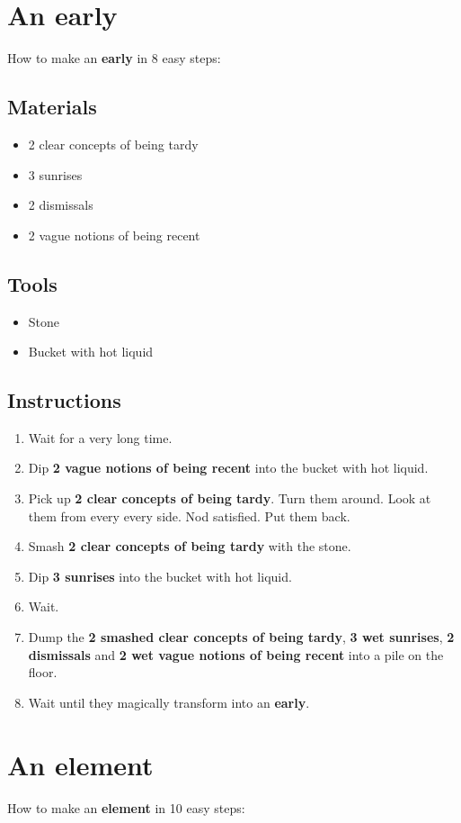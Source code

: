 \documentclass{article}
\begin{document}
\section{An early}How to make an \textbf{early} in 8 easy steps:

\subsection{Materials}\begin{itemize}
\item 
2 clear concepts of being tardy
\item 
3 sunrises
\item 
2 dismissals
\item 
2 vague notions of being recent
\end{itemize}
\subsection{Tools}\begin{itemize}
\item 
Stone
\item 
Bucket with hot liquid
\end{itemize}
\subsection{Instructions}\begin{enumerate}
\item 
Wait for a very long time.
\item 
Dip \textbf{2 vague notions of being recent} into the bucket with hot liquid.
\item 
Pick up \textbf{2 clear concepts of being tardy}. Turn them around. Look at them from every every side. Nod satisfied. Put them back.
\item 
Smash \textbf{2 clear concepts of being tardy} with the stone.
\item 
Dip \textbf{3 sunrises} into the bucket with hot liquid.
\item 
Wait.
\item 
Dump the \textbf{2 smashed clear concepts of being tardy}, \textbf{3 wet sunrises}, \textbf{2 dismissals} and \textbf{2 wet vague notions of being recent} into a pile on the floor.
\item 
Wait until they magically transform into an \textbf{early}.
\end{enumerate}
\newpage
\section{An element}How to make an \textbf{element} in 10 easy steps:
\end{document}
